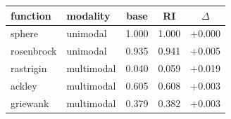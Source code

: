 \begin{tabular}{llccc}
\toprule
function & modality & base & RI & $\Delta$ \\
\midrule
sphere & unimodal & 1.000 & 1.000 & +0.000 \\
rosenbrock & unimodal & 0.935 & 0.941 & +0.005 \\
rastrigin & multimodal & 0.040 & 0.059 & +0.019 \\
ackley & multimodal & 0.605 & 0.608 & +0.003 \\
griewank & multimodal & 0.379 & 0.382 & +0.003 \\
\bottomrule
\end{tabular}
